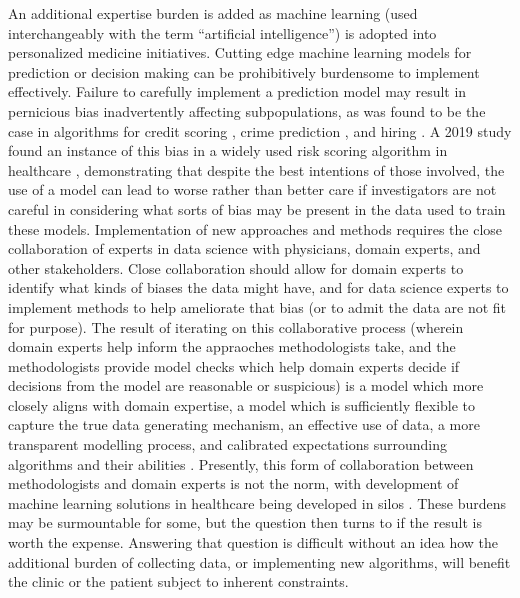 An additional expertise burden is added as machine learning (used interchangeably with the term “artificial intelligence”) is adopted into personalized medicine initiatives.  Cutting edge machine learning models for prediction or decision making can be prohibitively burdensome to implement effectively. Failure to carefully implement a prediction model may result in pernicious bias inadvertently affecting subpopulations, as was found to be the case in algorithms for credit scoring \cite{barocas2016big}, crime prediction \cite{lum2016predict}, and hiring \cite{ajunwa2020paradox}.  A 2019 study found an instance of this bias in a widely used risk scoring algorithm in healthcare \cite{obermeyer2019dissecting}, demonstrating that despite the best intentions of those involved, the use of a model can lead to worse rather than better care if investigators are not careful in considering what sorts of bias may be present in the data used to train these models.  Implementation of new approaches and methods requires the close collaboration of experts in data science  with physicians, domain experts, and other stakeholders.  Close collaboration should allow for domain experts to identify what kinds of biases the data might have, and for data science experts to implement methods to help ameliorate that bias (or to admit the data are not fit for purpose).  The result of iterating on this collaborative process (wherein domain experts help inform the appraoches methodologists take, and the methodologists provide model checks which help domain experts decide if decisions from the model are reasonable or suspicious) is a model which more closely aligns with domain expertise, a model which is sufficiently flexible to capture the true data generating mechanism, an effective use of data, a more transparent modelling process, and calibrated expectations surrounding algorithms and their abilities \cite{frohlich2018hype}.  Presently, this form of collaboration between methodologists and domain experts is not the norm, with development of machine learning solutions in healthcare being developed in silos \cite{wiens2019no}.  These burdens may be surmountable for some, but the question then turns to if the result is worth the expense.   Answering that question is difficult without an idea how the additional burden of collecting data, or implementing new algorithms, will benefit the clinic or the patient subject to inherent constraints. 

